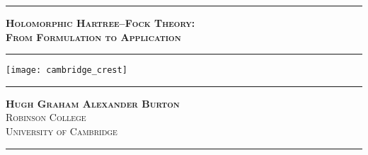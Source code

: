 \begin{titlepage}

\begin{center}

\rule{\linewidth}{1pt}
\linespread{1.3}
\textsc{\textbf{\LARGE Holomorphic Hartree--Fock Theory:\\}}
\textsc{\textbf{\LARGE From Formulation to Application\\}}
\rule{\linewidth}{2pt}

\vfill
\vfill

\texttt{[image: cambridge\_crest]}

\vfill 
\vfill


\rule{\linewidth}{1pt}
\textsc{\large \textbf{Hugh Graham Alexander Burton}\\
Robinson College\\
University of Cambridge}
\rule{\linewidth}{1pt}


\end{center}
\end{titlepage}
